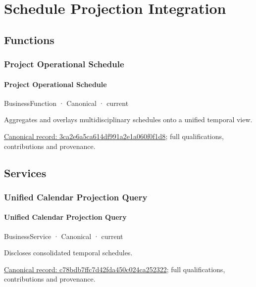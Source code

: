 \section{Schedule Projection Integration}

\subsection{Functions}

\subsubsection{Project Operational Schedule}

\paragraph{Project Operational Schedule}

\label{element:3ca2e6a5ca614df991a2e1a060f0f1d8}
{\small BusinessFunction · Canonical · current}\par

Aggregates and overlays multidisciplinary schedules onto a unified temporal view.


{\footnotesize \href{../../../../continuum/business/business-function/3ca2e6a5ca614df991a2e1a060f0f1d8.md}{Canonical record: 3ca2e6a5ca614df991a2e1a060f0f1d8}; full qualifications, contributions and provenance.}\par
\subsection{Services}

\subsubsection{Unified Calendar Projection Query}

\paragraph{Unified Calendar Projection Query}

\label{element:c78bdb7ffc7d42fda450c024ca252322}
{\small BusinessService · Canonical · current}\par

Discloses consolidated temporal schedules.


{\footnotesize \href{../../../../continuum/business/business-service/c78bdb7ffc7d42fda450c024ca252322.md}{Canonical record: c78bdb7ffc7d42fda450c024ca252322}; full qualifications, contributions and provenance.}\par
